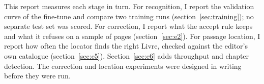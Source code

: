 This report measures each stage in turn. For recognition, I report the validation
curve of the fine-tune and compare two training runs
(section~\ref{sec:training}); no separate test set was scored. For correction,
I report what the accept rule keeps and what it refuses on a sample of
\corrPages{} pages (section~\ref{sec:e2}). For passage location, I report how
often the locator finds the right Livre, checked against the editor's own
catalogue (section~\ref{sec:e5}). Section~\ref{sec:e6} adds
throughput and chapter detection. The correction and location experiments were
designed in writing before they were run.
